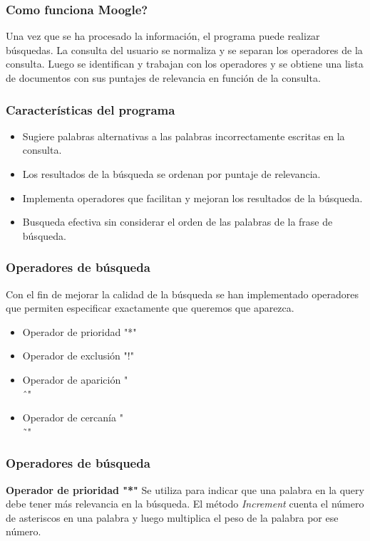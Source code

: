 \documentclass{beamer}
\begin{document}
\begin{frame}
    \frametitle{Como funciona Moogle?}
    Una vez que se ha procesado la información, el programa puede realizar búsquedas. La consulta del usuario se normaliza y se separan los operadores de la consulta. Luego se identifican y trabajan con los operadores y se obtiene una lista de documentos con sus puntajes de relevancia en función de la consulta.
\end{frame}

\begin{frame}
    \frametitle{Características del programa}
        \begin{itemize}
            \item Sugiere palabras alternativas a las palabras incorrectamente escritas en la consulta.
            \item Los resultados de la búsqueda se ordenan por puntaje de relevancia.
            \item Implementa operadores que facilitan y mejoran los resultados de la búsqueda.
            \item Busqueda efectiva sin considerar el orden de las palabras de la frase de búsqueda.
        \end{itemize}
\end{frame}
  
\begin{frame}
    \frametitle{Operadores de búsqueda}
    Con el fin de mejorar la calidad de la búsqueda se han implementado operadores
    que permiten especificar exactamente que queremos que aparezca.
        \begin{itemize}
            \item Operador de prioridad "*"
            \item Operador de exclusión "!"
            \item Operador de aparición "\\ˆ"
            \item Operador de cercanía "\\˜"
        \end{itemize}
\end{frame}

\begin{frame}
    \frametitle{Operadores de búsqueda}
    \textbf{Operador de prioridad "*"}
    Se utiliza para indicar que una palabra en la query
    debe tener más relevancia en la búsqueda. El método \emph{Increment} cuenta
    el número de asteriscos en una palabra y luego multiplica el peso de la
    palabra por ese número.
\end{frame}
\end{document}
